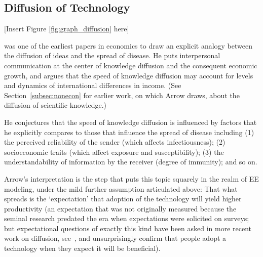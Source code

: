 
\subsection{Diffusion of Technology}\label{subsubsec:techDiffusion}

\begin{center}
	[Insert Figure \ref{fig:graph_diffusion}  here]
\end{center}


\href{https://github.com/iworld1991/EpiExp/blob/master/Literature/arrow_classificatory_1969.pdf}{\cite{arrow_classificatory_1969}} was one of the earliest papers in economics to draw an explicit analogy between the diffusion of ideas and the spread of disease.  He puts interpersonal communication at the center of knowledge diffusion and the consequent economic growth, and argues that the speed of knowledge diffusion may account for levels and dynamics of international differences in income.  (See Section~\ref{subsec:nonecon} for earlier work, on which Arrow draws, about the diffusion of scientific knowledge.)

He conjectures that the speed of knowledge diffusion is influenced by factors that he explicitly compares to  those that influence the spread of disease including (1) the perceived reliability of the sender (which affects infectiousness); (2) socioeconomic traits (which affect exposure and susceptibility); (3) the understandability of information by the receiver (degree of immunity); and so on.

Arrow's interpretation is the step that puts this topic squarely in the realm of EE modeling, under the mild further assumption articulated above: That what spreads is the `expectation' that adoption of the technology will yield higher productivity (an expectation that was not originally measured because the seminal research predated the era when expectations were solicited on surveys; but expectational questions of exactly this kind have been asked in more recent work on diffusion, see~\cite{banerjee2013diffusion}, and unsurprisingly confirm that people adopt a technology when they expect it will be beneficial).

